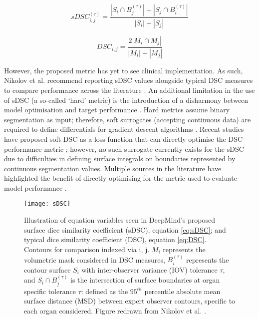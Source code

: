 \begin{equation}
sDSC_{i,j}^{(\tau)} = \frac{|S_{i} \cap B_{j}^{(\tau)}| + |S_{j} \cap B_{i}^{(\tau)}|}{|S_{i}| + |S_{j}|}
\label{eq:sDSC}
\end{equation}

\begin{equation}
DSC_{i,j} = \frac{2|M_{i} \cap M_{j}|}{|M_{i}| + |M_{j}|}
\label{eq:DSC}
\end{equation}

However, the proposed metric has yet to see clinical implementation. As such,
Nikolov et al. recommend reporting sDSC values alongside typical DSC measures to
compare performance across the literature \cite{Nikolov_2018}. An additional
limitation in the use of sDSC (a so-called `hard' metric) is the introduction of
a disharmony between model optimisation and target performance
\cite{Bertels2019}. Hard metrics assume binary segmentation as input; therefore,
soft surrogates (accepting continuous data) are required to define differentials
for gradient descent algorithms \cite{Bertels2019}. Recent studies have proposed
soft DSC as a loss function that can directly optimise the DSC performance
metric \cite{Bertels2019}; however, no such surrogate currently exists for the
sDSC due to difficulties in defining surface integrals on boundaries represented
by continuous segmentation values. Multiple sources in the literature have
highlighted the benefit of directly optimising for the metric used to evaluate
model performance \cite{Bertels2019, Vapnik2000}.

\begin{figure}[h]
	\begin{center}
		\texttt{[image: sDSC]}
		\caption{Illustration of equation variables seen in DeepMind's proposed
      surface dice similarity coefficient (sDSC), equation \ref{eq:sDSC}; and
      typical dice similarity coefficient (DSC), equation \ref{eq:DSC}. Contours
      for comparison indexed via i, j. $M_{i}$ represents the volumetric mask
      considered in DSC measures, $B_{i}^{(\tau)}$ represents the contour
      surface $S_{i}$ with inter-observer variance (IOV) tolerance $\tau$, and
      $S_{i} \cap B_{j}^{(\tau)}$ is the intersection of surface boundaries at
      organ specific tolerance $\tau$: defined as the $95^{th}$ percentile
      absolute mean surface distance (MSD) between expert observer contours,
      specific to each organ considered. Figure redrawn from Nikolov et al.
      \cite{Nikolov_2018}.}
		\label{fig:sDSC}
	\end{center}
\end{figure}

